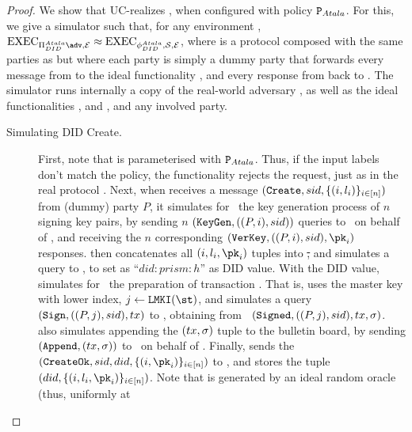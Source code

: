 \begin{proof}
  We show that \RealPKIDIDAtala UC-realizes \IdealFPKIDID, when configured
  with policy $\P_{Atala}$. For this, we give a simulator \Sim such that, for
  any environment \Env, $\Exec_{\RealPKIDIDAtala\adv,\Env} \approx
  \Exec_{\phiDIDAtala,\Sim,\Env}$,
  where \phiDIDAtala is a protocol composed with the same parties as
  \RealPKIDIDAtala but where each party is simply a dummy party that forwards
  every message from \Env to the ideal functionality \IdealFPKIDID, and every
  response from \IdealFPKIDID back to \Env. The simulator \Sim runs internally a
  copy of the real-world adversary \adv, as well as the ideal functionalities
  \IdealFRO, \IdealFSig and \IdealFaobb, and any involved party.

  \begin{description}
  \item[Simulating DID Create.] %
    First, note that \IdealFPKIDID is parameterised with $\P_{Atala}$. Thus,
    if the input labels don't match the policy, the functionality rejects the
    request, just as in the real protocol \RealPKIDIDAtala.
    Next, when \Sim receives a message $(\uccmd{Create},\sid,\lbrace (i,\lbl_i)
    \rbrace_{i\in[n]})$ from (dummy) party $P$, it simulates for \adv~the key
    generation process of $n$ signing key pairs, by sending $n$
    $(\uccmd{KeyGen},((P,i),\sid))$ queries to \adv~on
    behalf of \IdealFSig, and receiving the $n$ corresponding $(\uccmd{VerKey}, 
    ((P,i), \sid), \pk_i)$ responses.
    \Sim then concatenates all $(i,\lbl_i,\pk_i)$ tuples into \st, and simulates
    a query to \IdealFRO {}, to set
    \did as ``$did:prism: h$'' as DID value.
    With the DID value, \Sim simulates for \adv~the preparation of transaction
    \tx. That is, \Sim uses the master key with lower index, $j \gets
    \LMKI(\st)$, and simulates a query $(\uccmd{Sign},((P,j),\sid),\tx)$ to
    \IdealFSig, obtaining from \adv~$(\uccmd{Signed},((P,j),\sid),\tx,\sig)$.
    \Sim also simulates appending the $(\tx,\sig)$ tuple to the bulletin board,
    by sending $(\uccmd{Append},(\tx,\sig))$ to \adv~on behalf of \IdealFaobb.
    Finally, \Sim sends the $(\uccmd{CreateOk},\sid,\did,\lbrace (i,\pk_i)
    \rbrace_{i\in[n]})$ to \IdealFPKIDID, and stores the tuple $(\did,\lbrace
    (i,\lbl_i,\pk_i)\rbrace_{i\in[n]})$.
    Note that \did is generated by an ideal random oracle (thus, uniformly at

\end{description}
\end{proof}
